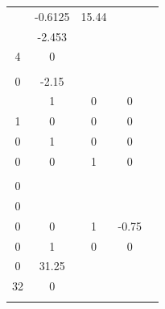 \documentclass[runningheads,a4paper]{llncs}
\begin{document}
\begin{table}[htb]
\begin{tabular}{|c|c|c|c|c|}
\begin{array}{ccc}
0.6125	& -0.6125	& 15.44 \\
\end{array}\right]$ & 0 \\ \hline
Pendulum   & $\left[\begin{array}{cc}
0		& -2.453	\\
4		& 0			\\	
\end{array}\right]$ & $\left[\begin{array}{c}
4 \\ 0
\end{array}\right]$ & $\left[\begin{array}{cc}
-1.225	& -2.15 	\\
\end{array}\right]$           & 9.8           \\ \hline
\begin{tabular}[c]{@{}c@{}}Inverted\\ Pendulum\end{tabular} & $\left[\begin{array}{cccc}
0		& 1		& 0 	& 0	\\
1		& 0		& 0		& 0	\\
0		& 1 	& 0		& 0 \\
0		& 0		& 1 	& 0 \\	
\end{array}\right]$ & $\left[\begin{array}{c}
1 \\ 0 \\ 0 \\ 0
\end{array}\right]$  & $\left[\begin{array}{cccc}
0	& 0	& 1 & -0.75 \\
0	& 1	& 0	& 0		
\end{array}\right]$ & $\left[\begin{array}{c}
0 \\
0 \end{array}\right]$ \\ \hline
\begin{tabular}[c]{@{}c@{}}Magnetic\\ Suspension\end{tabular} & $\left[\begin{array}{cc}
0		& 31.25	\\
32		& 0		\\	
\end{array}\right]$ & $\left[\begin{array}{c}

\end{array}
\end{tabular}
\end{table}
\end{document}
